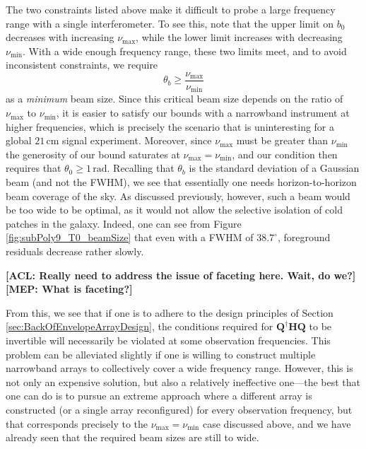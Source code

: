 \documentclass[twolcolumn,apj,iop,numberedappendix]{emulateapj}
\newcommand{\Hmat}{\mathbf{H}}
\newcommand{\Q}{\mathbf{Q}}
\newcommand{\acl}[1]{{\color{red} \textbf{[ACL:  #1]}}}
\newcommand{\mep}[1]{{\color{applegreen} \textbf{[MEP:  #1]}}}
\begin{document}
The two constraints listed above make it difficult to probe a large frequency range with a single interferometer.  To see this, note that the upper limit on $b_0$ decreases with increasing $\nu_\textrm{max}$, while the lower limit increases with decreasing $\nu_\textrm{min}$.  With a wide enough frequency range, these two limits meet, and to avoid inconsistent constraints, we require
\begin{equation}
\theta_b \ge \frac{\nu_\textrm{max} }{\nu_\textrm{min}}
\end{equation}
as a \emph{minimum} beam size.  Since this critical beam size depends on the ratio of $\nu_\textrm{max}$ to $\nu_\textrm{min}$, it is easier to satisfy our bounds with a narrowband instrument at higher frequencies, which is precisely the scenario that is uninteresting for a global $21\,\textrm{cm}$ signal experiment. Moreover, since $\nu_\textrm{max}$ must be greater than $\nu_\textrm{min}$ the generosity of our bound saturates at $\nu_\textrm{max} = \nu_\textrm{min}$, and our condition then requires that $\theta_0 \ge 1\,\textrm{rad}$. Recalling that $\theta_b$ is the standard deviation of a Gaussian beam (and not the FWHM), we see that essentially one needs horizon-to-horizon beam coverage of the sky. As discussed previously, however, such a beam would be too wide to be optimal, as it would not allow the selective isolation of cold patches in the galaxy. Indeed, one can see from Figure \ref{fig:subPoly9_T0_beamSize} that even with a FWHM of $38.7^\circ$, foreground residuals decrease rather slowly.

\acl{Really need to address the issue of faceting here. Wait, do we?} \mep{What is faceting?}

From this, we see that if one is to adhere to the design principles of Section \ref{sec:BackOfEnvelopeArrayDesign}, the conditions required for $\Q^\dagger \Hmat \Q$ to be invertible will necessarily be violated at some observation frequencies. This problem can be alleviated slightly if one is willing to construct multiple narrowband arrays to collectively cover a wide frequency range. However, this is not only an expensive solution, but also a relatively ineffective one---the best that one can do is to pursue an extreme approach where a different array is constructed (or a single array reconfigured) for every observation frequency, but that corresponds precisely to the $\nu_\textrm{max} = \nu_\textrm{min}$ case discussed above, and we have already seen that the required beam sizes are still to wide.
\end{document}
